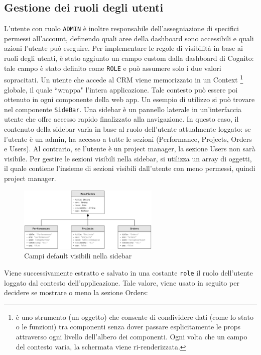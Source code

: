 \documentclass[target=bach,aauheader=,style=]{thud}
\begin{document}
\subsection{Gestione dei ruoli degli utenti }
L'utente con ruolo \texttt{ADMIN} è inoltre responsabile dell'assegniazione di specifici permessi all'account, definendo quali aree della dashboard sono accessibili e quali azioni l'utente può eseguire. Per implementare le regole di visibilità in base ai ruoli degli utenti, è stato aggiunto un campo custom dalla dashboard di Cognito: tale campo è stato definito come \texttt{ROLE} e può assumere solo i due valori sopracitati. Un utente che accede al CRM viene memorizzato in un Context \footnote{è uno strumento (un oggetto) che consente di condividere dati (come lo stato o le funzioni) tra componenti senza dover passare esplicitamente le props attraverso ogni livello dell'albero dei componenti. Ogni volta che un campo del contesto varia, la schermata viene ri-renderizzata.} globale, il quale ``wrappa" l'intera applicazione. Tale contesto può essere poi ottenuto in ogni componente della web app. Un esempio di utilizzo si può trovare nel componente \texttt{SideBar}. Una sidebar è un pannello laterale in un'interfaccia utente che offre accesso rapido finalizzato alla navigazione. In questo caso, il contenuto della sidebar varia in base al ruolo dell'utente attualmente loggato: se l'utente è un admin, ha accesso a tutte le sezioni (Performance, Projects, Orders e Users). Al contrario, se l'utente è un project manager, la sezione Users non sarà visibile. Per gestire le sezioni visibili nella sidebar, si utilizza un array di oggetti, il quale contiene l'insieme di sezioni visibili dall'utente con meno permessi, quindi project manager. 

\begin{figure}[H]
    \centering
    \includegraphics[width=0.6\textwidth]{img/diagrammi/uml_menufields.pdf} 
    \caption{Campi default visibili nella sidebar}
\end{figure}

\noindent Viene successivamente estratto e salvato in una costante \texttt{role} il ruolo dell'utente loggato dal contesto dell'applicazione. Tale valore, viene usato in seguito per decidere se mostrare o meno la sezione Orders:
\end{document}
